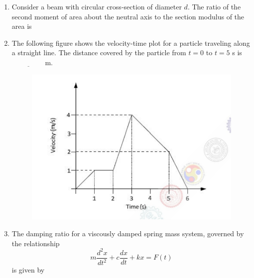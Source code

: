 \documentclass[journal]{IEEEtran}
\begin{document}
\begin{enumerate}[leftmargin=0pt]
    \item Consider a beam with circular cross-section of diameter $d$. The ratio of the second moment of area about the neutral axis to the section modulus of the area is

    \hfill{}

    \begin{enumerate}
    \end{enumerate}

    \item The following figure shows the velocity-time plot for a particle traveling along a straight line. The distance covered by the particle from $t = 0$ to $t = 5$ s is
    $\underline{\hspace{2cm}}$m.
    \begin{figure}[h]
\centering
\includegraphics[width=0.5\columnwidth]{Figs/image (22).png}
\caption*{}
\label{fig:17}
\end{figure}

    \hfill{}


    \item The damping ratio for a viscously damped spring mass system, governed by the relationship
    \[
        m \frac{d^2 x}{dt^2} + c \frac{dx}{dt} + k x = F(t)
    \]
    is given by

    \hfill{}
    
    \begin{enumerate}
    \end{enumerate}
    

\end{enumerate}
\end{document}
